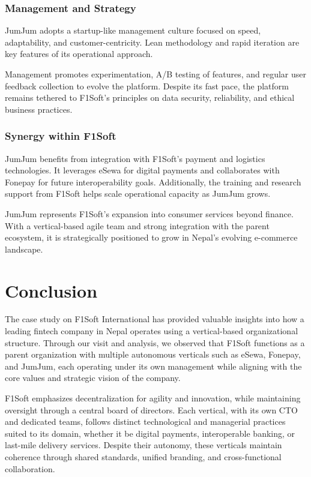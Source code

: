 \documentclass[12pt, a4paper]{report}
\begin{document}
\vspace{18pt}
\subsection{Management and Strategy}

JumJum adopts a startup-like management culture focused on speed, adaptability, and customer-centricity. Lean methodology and rapid iteration are key features of its operational approach. 

Management promotes experimentation, A/B testing of features, and regular user feedback collection to evolve the platform. Despite its fast pace, the platform remains tethered to F1Soft’s principles on data security, reliability, and ethical business practices.

\vspace{18pt}
\subsection{Synergy within F1Soft}

JumJum benefits from integration with F1Soft’s payment and logistics technologies. It leverages eSewa for digital payments and collaborates with Fonepay for future interoperability goals. Additionally, the training and research support from F1Soft helps scale operational capacity as JumJum grows.

\bigskip
JumJum represents F1Soft’s expansion into consumer services beyond finance. With a vertical-based agile team and strong integration with the parent ecosystem, it is strategically positioned to grow in Nepal’s evolving e-commerce landscape.

\chapter{Conclusion}
The case study on F1Soft International has provided valuable insights into how a leading fintech company in Nepal operates using a vertical-based organizational structure. Through our visit and analysis, we observed that F1Soft functions as a parent organization with multiple autonomous verticals such as eSewa, Fonepay, and JumJum, each operating under its own management while aligning with the core values and strategic vision of the company.

F1Soft emphasizes decentralization for agility and innovation, while maintaining oversight through a central board of directors. Each vertical, with its own CTO and dedicated teams, follows distinct technological and managerial practices suited to its domain, whether it be digital payments, interoperable banking, or last-mile delivery services. Despite their autonomy, these verticals maintain coherence through shared standards, unified branding, and cross-functional collaboration.
\end{document}

